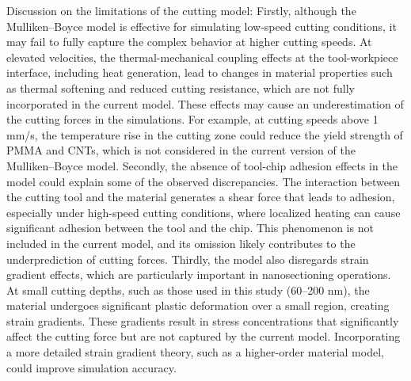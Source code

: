 \documentclass{article}
\begin{document}
Discussion on the limitations of the cutting model: Firstly, although the Mulliken–Boyce model is effective for simulating low-speed cutting conditions, it may fail to fully capture the complex behavior at higher cutting speeds. At elevated velocities, the thermal-mechanical coupling effects at the tool-workpiece interface, including heat generation, lead to changes in material properties such as thermal softening and reduced cutting resistance, which are not fully incorporated in the current model. These effects may cause an underestimation of the cutting forces in the simulations. For example, at cutting speeds above 1 mm/s, the temperature rise in the cutting zone could reduce the yield strength of PMMA and CNTs, which is not considered in the current version of the Mulliken–Boyce model. Secondly, the absence of tool-chip adhesion effects in the model could explain some of the observed discrepancies. The interaction between the cutting tool and the material generates a shear force that leads to adhesion, especially under high-speed cutting conditions, where localized heating can cause significant adhesion between the tool and the chip. This phenomenon is not included in the current model, and its omission likely contributes to the underprediction of cutting forces. Thirdly, the model also disregards strain gradient effects, which are particularly important in nanosectioning operations. At small cutting depths, such as those used in this study (60–200 nm), the material undergoes significant plastic deformation over a small region, creating strain gradients. These gradients result in stress concentrations that significantly affect the cutting force but are not captured by the current model. Incorporating a more detailed strain gradient theory, such as a higher-order material model, could improve simulation accuracy.
\end{document}
